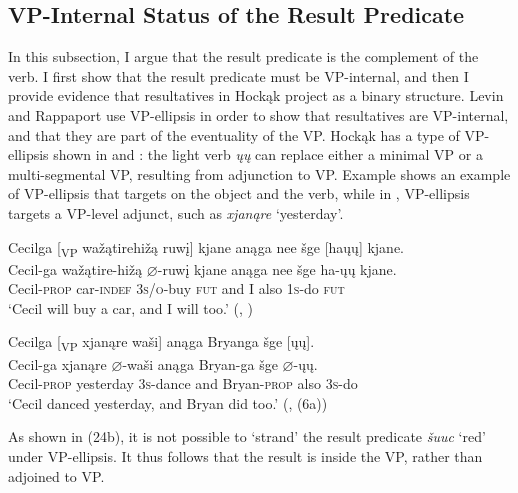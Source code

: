 \documentclass[output=paper]{LSP/langsci}
\begin{document}
\subsection{VP-Internal Status of the Result Predicate}\label{sec:rosen:3.2}

In this subsection, I argue that the result predicate is the complement of the verb. I first show that the result predicate must be VP-internal, and then I provide evidence that resultatives in Hockąk project as a binary structure. Levin and Rappaport \citet{Hovav1995} use VP-ellipsis in order to show that resultatives are VP-internal, and that they are part of the eventuality of the VP. Hockąk has a type of VP-ellipsis shown in  and : the light verb \textit{ųų} can replace either a minimal VP or a multi-segmental VP, resulting from adjunction to VP. Example  shows an example of VP-ellipsis that targets on the object and the verb, while in , VP-ellipsis targets a VP-level adjunct, such as \textit{xjanąre} `yesterday'.

\begin{exe}
\ex \label{ex:rosen:22}
\glll Cecilga [\textsubscript{VP} wažątirehižą ruwį] kjane anąga nee šge [haųų] kjane.\\
Cecil-ga {} wažątire-hižą {$\varnothing$}-ruwį kjane anąga nee šge ha-ųų kjane.\\
Cecil-\textsc{prop} {} car-\textsc{indef} \textsc{3s/o}-buy \textsc{fut} and I also \textsc{1s}-do \textsc{fut}\\
\glt `Cecil will buy a car, and I will too.' (\citealt{Johnson2013}, )

\ex \label{ex:rosen:23}
\glll Cecilga [\textsubscript{VP} xjanąre waši] anąga Bryanga šge [ųų].\\
Cecil-ga {} xjanąre {$\varnothing$}-waši anąga Bryan-ga šge {$\varnothing$}-ųų.\\
Cecil-\textsc{prop} {} yesterday \textsc{3s}-dance and Bryan-\textsc{prop} also \textsc{3s}-do\\
\glt `Cecil danced yesterday, and Bryan did too.' (\citealt{Johnson2013}, (6a))

\end{exe}

As shown in (24b), it is not possible to `strand' the result predicate \textit{šuuc} `red' under VP-ellipsis. It thus follows that the result is inside the VP, rather than adjoined to VP.
\end{document}
